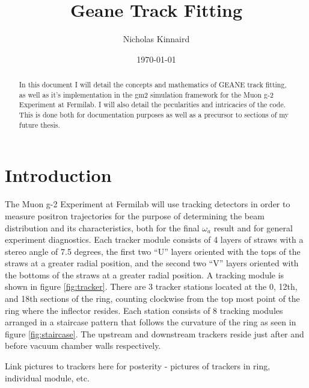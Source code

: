 \documentclass{article}
\begin{document}
\title{Geane Track Fitting}
\author{Nicholas Kinnaird}
\date{\today}
\maketitle

\begin{abstract}

    In this document I will detail the concepts and mathematics of GEANE track fitting, as well as it's implementation in the gm2 simulation framework for the Muon g-2 Experiment at Fermilab. I will also detail the pecularities and intricacies of the code. This is done both for documentation purposes as well as a precursor to sections of my future thesis.

\end{abstract}



\section{Introduction}

  The Muon g-2 Experiment at Fermilab will use tracking detectors in order to measure positron trajectories for the purpose of determining the beam distribution and its characteristics, both for the final $\omega_{a}$ result and for general experiment diagnostics. Each tracker module consists of 4 layers of straws with a stereo angle of 7.5 degrees, the first two ``U'' layers oriented with the tops of the straws at a greater radial position, and the second two ``V'' layers oriented with the bottoms of the straws at a greater radial position. A tracking module is shown in figure \ref{fig:tracker}. There are 3 tracker stations located at the 0, 12th, and 18th sections of the ring, counting clockwise from the top most point of the ring where the inflector resides. Each station consists of 8 tracking modules arranged in a staircase pattern that follows the curvature of the ring as seen in figure \ref{fig:staircase}. The upstream and downstream trackers reside just after and before vacuum chamber walls respectively. 

  Link pictures to trackers here for posterity - pictures of trackers in ring, individual module, etc. 
\end{document}
